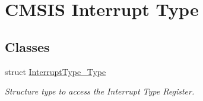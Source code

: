 \hypertarget{group___c_m_s_i_s___interrupt_type}{\section{\-C\-M\-S\-I\-S \-Interrupt \-Type}
\label{group___c_m_s_i_s___interrupt_type}
}
\subsection*{\-Classes}
\begin{DoxyCompactItemize}
\item 
struct \hyperlink{struct_interrupt_type___type}{\-Interrupt\-Type\-\_\-\-Type}
\begin{DoxyCompactList}\small\item\em \-Structure type to access the \-Interrupt \-Type \-Register. \end{DoxyCompactList}\end{DoxyCompactItemize}
